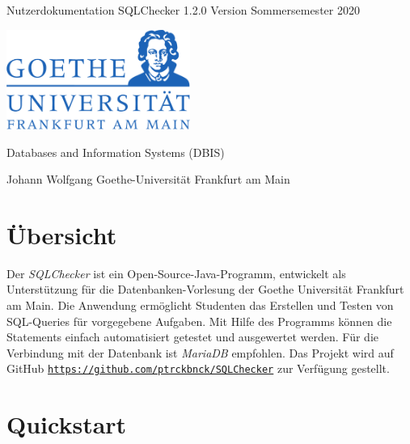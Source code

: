 \documentclass[11pt]{article}
\begin{document}
 \hypersetup{pageanchor=false}
\begin{titlepage}
	\begin{center}
		
		\vspace{6cm}
		
		{\huge Nutzerdokumentation SQLChecker 1.2.0}
		{\small Version Sommersemester 2020}
		\vspace{0.2cm}
		
		
		
		\vspace{2cm}
		\includegraphics[width=6cm]{figures/goethe}
		\vspace{2.5cm}
		
		Databases and Information Systems (DBIS)
		
		Johann Wolfgang Goethe-Universität Frankfurt am Main
		
		
	\end{center}
	\vspace*{\fill}
	
\end{titlepage}
 \hypersetup{pageanchor=true}
 
\tableofcontents
 \newpage
\section{Übersicht}
Der \textit{SQLChecker} ist ein Open-Source-Java-Programm, entwickelt als Unterstützung für die Datenbanken-Vorlesung der Goethe Universität Frankfurt am Main.
Die Anwendung ermöglicht Studenten das Erstellen und Testen von SQL-Queries für vorgegebene Aufgaben. Mit Hilfe des Programms können die Statements einfach automatisiert getestet und ausgewertet werden.
Für die Verbindung mit der Datenbank ist \textit{MariaDB} empfohlen.
Das Projekt wird auf GitHub  \href{https://github.com/ptrckbnck/SQLChecker}{\texttt{https://github.com/ptrckbnck/SQLChecker}} zur Verfügung gestellt.

\section{Quickstart}
\end{document}
